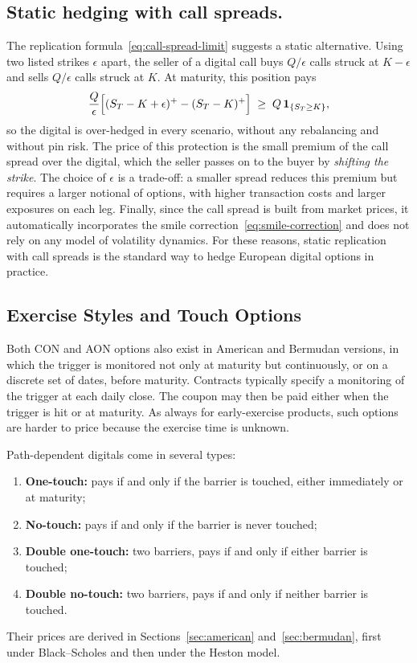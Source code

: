 \documentclass[11pt,a4paper]{article}
\theoremstyle{remark}
\begin{document}
\subsection{Static hedging with call spreads.}
The replication formula~\eqref{eq:call-spread-limit} suggests a static
alternative. Using two listed strikes $\epsilon$ apart, the seller of a digital
call buys $Q/\epsilon$ calls struck at $K-\epsilon$ and sells $Q/\epsilon$
calls struck at $K$. At maturity, this position pays
\begin{equation*}
  \frac{Q}{\epsilon}\Bigl[(S_T - K + \epsilon)^+ - (S_T - K)^+\Bigr]
  \;\geq\; Q\,\mathbf{1}_{\{S_T \geq K\}},
\end{equation*}
so the digital is over-hedged in every scenario, without any rebalancing and
without pin risk. The price of this protection is the small premium of the call
spread over the digital, which the seller passes on to the buyer by
\emph{shifting the strike}. The choice of $\epsilon$ is a trade-off: a smaller
spread reduces this premium but requires a larger notional of options, with
higher transaction costs and larger exposures on each leg. Finally, since the
call spread is built from market prices, it automatically incorporates the
smile correction~\eqref{eq:smile-correction} and does not rely on any model of
volatility dynamics. For these reasons, static replication with call spreads is
the standard way to hedge European digital options in practice.

\subsection{Exercise Styles and Touch Options}

Both CON and AON options also exist in American and Bermudan versions, in which
the trigger is monitored not only at maturity but continuously, or on a
discrete set of dates, before maturity. Contracts typically specify a
monitoring of the trigger at each daily close. The coupon may then be paid
either when the trigger is hit or at maturity. As always for early-exercise
products, such options are harder to price because the exercise time is
unknown.

Path-dependent digitals come in several types:
\begin{enumerate}
  \item \textbf{One-touch:} pays if and only if the barrier is touched, either
        immediately or at maturity;
  \item \textbf{No-touch:} pays if and only if the barrier is never touched;
  \item \textbf{Double one-touch:} two barriers, pays if and only if either
        barrier is touched;
  \item \textbf{Double no-touch:} two barriers, pays if and only if neither
        barrier is touched.
\end{enumerate}
Their prices are derived in Sections~\ref{sec:american} and~\ref{sec:bermudan},
first under Black--Scholes and then under the Heston model.
\end{document}
